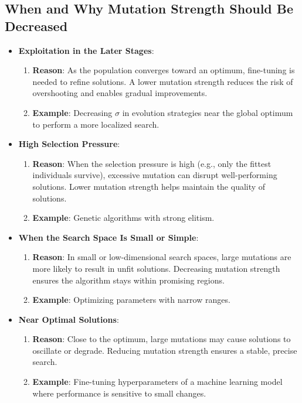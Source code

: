 \documentclass[12pt,letterpaper]{article}
\begin{document}
\subsection*{When and Why Mutation Strength Should Be Decreased}
\begin{itemize}
    \item \textbf{Exploitation in the Later Stages}:
    \begin{enumerate}
        \item \textbf{Reason}: As the population converges toward an optimum, fine-tuning is needed to refine solutions. A lower mutation strength reduces the risk of overshooting and enables gradual improvements.
        \item \textbf{Example}: Decreasing \( \sigma \) in evolution strategies near the global optimum to perform a more localized search.
    \end{enumerate}
    \item \textbf{High Selection Pressure}:
    \begin{enumerate}
        \item \textbf{Reason}: When the selection pressure is high (e.g., only the fittest individuals survive), excessive mutation can disrupt well-performing solutions. Lower mutation strength helps maintain the quality of solutions.
        \item \textbf{Example}: Genetic algorithms with strong elitism.
    \end{enumerate}
    \item \textbf{When the Search Space Is Small or Simple}:
    \begin{enumerate}
        \item \textbf{Reason}: In small or low-dimensional search spaces, large mutations are more likely to result in unfit solutions. Decreasing mutation strength ensures the algorithm stays within promising regions.
        \item \textbf{Example}: Optimizing parameters with narrow ranges.
    \end{enumerate}
    \item \textbf{Near Optimal Solutions}:
    \begin{enumerate}
        \item \textbf{Reason}: Close to the optimum, large mutations may cause solutions to oscillate or degrade. Reducing mutation strength ensures a stable, precise search.
        \item \textbf{Example}: Fine-tuning hyperparameters of a machine learning model where performance is sensitive to small changes.
    \end{enumerate}
\end{itemize}
\end{document}
